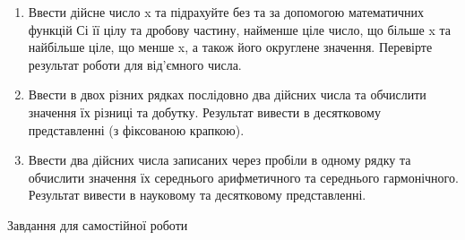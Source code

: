 \documentclass[]{article}
\begin{document}
\begin{enumerate}
\item
  Ввести дійсне число x та підрахуйте без та за допомогою математичних
  функцій Сі її цілу та дробову частину, найменше ціле число, що більше
  x та найбільше ціле, що менше x, а також його округлене значення.
  Перевірте результат роботи для від'ємного числа.
\item
  Ввести в двох різних рядках послідовно два дійсних числа та обчислити
  значення їх різниці та добутку. Результат вивести в десятковому
  представленні (з фіксованою крапкою).
\item
  Ввести два дійсних числа записаних через пробіли в одному рядку та
  обчислити значення їх середнього арифметичного та середнього
  гармонічного. Результат вивести в науковому та десятковому
  представленні.
\end{enumerate}

Завдання для самостійної роботи
\end{document}

